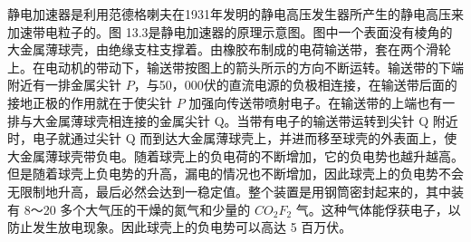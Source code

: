 静电加速器是利用范德格喇夫在1931年发明的静电高压发生器所产生的静电高压来加速带电粒子的。图
13.3是静电加速器的原理示意图。图中一个表面没有棱角的大金属薄球壳，由绝缘支柱支撑着。由橡胶布制成的电荷输送带，套在两个滑轮上。在电动机的带动下，输送带按图上的箭头所示的方向不断运转。输送带的下端附近有一排金属尖针
\(P\)，与50，000伏的直流电源的负极相连接，在输送带后面的接地正极的作用就在于使尖针
\(P\)
加强向传送带喷射电子。在输送带的上端也有一排与大金属薄球壳相连接的金属尖针
Q。当带有电子的输送带运转到尖针 Q 附近时，电子就通过尖针 Q
而到达大金属薄球壳上，并进而移至球壳的外表面上，使大金属薄球壳带负电。随着球壳上的负电荷的不断增加，它的负电势也越升越高。但是随着球壳上负电势的升高，漏电的情况也不断增加，因此球壳上的负电势不会无限制地升高，最后必然会达到一稳定值。整个装置是用钢筒密封起来的，其中装有
8～20 多个大气压的干燥的氮气和少量的 \(CO_{2}F_{2}\)
气。这种气体能俘获电子，以防止发生放电现象。因此球壳上的负电势可以高达 5
百万伏。

